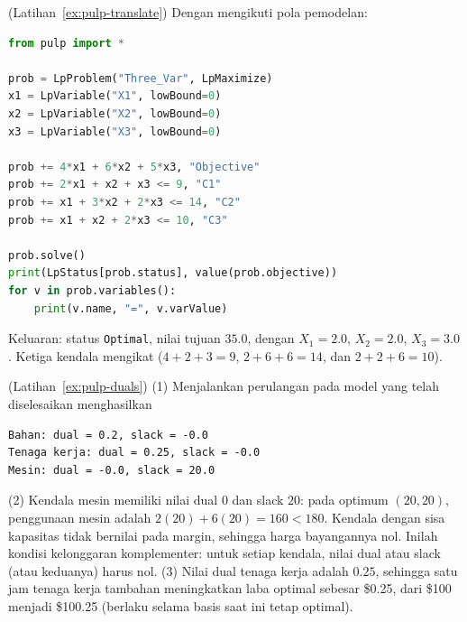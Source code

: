 \begin{solution}(Latihan~\ref{ex:pulp-translate})
Dengan mengikuti pola pemodelan:
\begin{lstlisting}[language=Python]
from pulp import *

prob = LpProblem("Three_Var", LpMaximize)
x1 = LpVariable("X1", lowBound=0)
x2 = LpVariable("X2", lowBound=0)
x3 = LpVariable("X3", lowBound=0)

prob += 4*x1 + 6*x2 + 5*x3, "Objective"
prob += 2*x1 + x2 + x3 <= 9, "C1"
prob += x1 + 3*x2 + 2*x3 <= 14, "C2"
prob += x1 + x2 + 2*x3 <= 10, "C3"

prob.solve()
print(LpStatus[prob.status], value(prob.objective))
for v in prob.variables():
    print(v.name, "=", v.varValue)
\end{lstlisting}
Keluaran: status \texttt{Optimal}, nilai tujuan $35.0$, dengan $X_1 = 2.0$, $X_2 = 2.0$, $X_3 = 3.0$. Ketiga kendala mengikat ($4+2+3 = 9$, $2+6+6 = 14$, dan $2+2+6 = 10$).
\end{solution}

\begin{solution}(Latihan~\ref{ex:pulp-duals})
(1) Menjalankan perulangan pada model yang telah diselesaikan menghasilkan
\begin{verbatim}
Bahan: dual = 0.2, slack = -0.0
Tenaga kerja: dual = 0.25, slack = -0.0
Mesin: dual = -0.0, slack = 20.0
\end{verbatim}
(2) Kendala mesin memiliki nilai dual $0$ dan slack $20$: pada optimum $(20,20)$, penggunaan mesin adalah $2(20) + 6(20) = 160 < 180$. Kendala dengan sisa kapasitas tidak bernilai pada margin, sehingga harga bayangannya nol. Inilah kondisi kelonggaran komplementer: untuk setiap kendala, nilai dual atau slack (atau keduanya) harus nol.
(3) Nilai dual tenaga kerja adalah $0.25$, sehingga satu jam tenaga kerja tambahan meningkatkan laba optimal sebesar \$0.25, dari \$100 menjadi \$100.25 (berlaku selama basis saat ini tetap optimal).
\end{solution}

